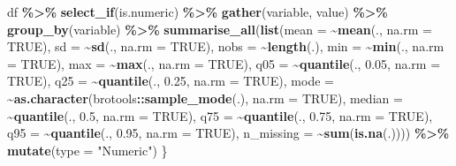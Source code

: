 \documentclass[
]{article}
\newenvironment{Shaded}{\begin{snugshade}}{\end{snugshade}}
\newcommand{\DataTypeTok}[1]{\textcolor[rgb]{0.13,0.29,0.53}{#1}}
\newcommand{\FloatTok}[1]{\textcolor[rgb]{0.00,0.00,0.81}{#1}}
\newcommand{\KeywordTok}[1]{\textcolor[rgb]{0.13,0.29,0.53}{\textbf{#1}}}
\newcommand{\NormalTok}[1]{#1}
\newcommand{\OperatorTok}[1]{\textcolor[rgb]{0.81,0.36,0.00}{\textbf{#1}}}
\newcommand{\OtherTok}[1]{\textcolor[rgb]{0.56,0.35,0.01}{#1}}
\newcommand{\StringTok}[1]{\textcolor[rgb]{0.31,0.60,0.02}{#1}}
\begin{document}
\begin{Shaded}
\begin{Highlighting}[]
\NormalTok{    df }\OperatorTok{\%\textgreater{}\%}
\StringTok{        }\KeywordTok{select\_if}\NormalTok{(is.numeric) }\OperatorTok{\%\textgreater{}\%}
\StringTok{        }\KeywordTok{gather}\NormalTok{(variable, value) }\OperatorTok{\%\textgreater{}\%}
\StringTok{        }\KeywordTok{group\_by}\NormalTok{(variable) }\OperatorTok{\%\textgreater{}\%}
\StringTok{        }\KeywordTok{summarise\_all}\NormalTok{(}\KeywordTok{list}\NormalTok{(}\DataTypeTok{mean =} \OperatorTok{\textasciitilde{}}\KeywordTok{mean}\NormalTok{(., }\DataTypeTok{na.rm =} \OtherTok{TRUE}\NormalTok{),}
                           \DataTypeTok{sd =} \OperatorTok{\textasciitilde{}}\KeywordTok{sd}\NormalTok{(., }\DataTypeTok{na.rm =} \OtherTok{TRUE}\NormalTok{),}
                           \DataTypeTok{nobs =} \OperatorTok{\textasciitilde{}}\KeywordTok{length}\NormalTok{(.),}
                           \DataTypeTok{min =} \OperatorTok{\textasciitilde{}}\KeywordTok{min}\NormalTok{(., }\DataTypeTok{na.rm =} \OtherTok{TRUE}\NormalTok{),}
                           \DataTypeTok{max =} \OperatorTok{\textasciitilde{}}\KeywordTok{max}\NormalTok{(., }\DataTypeTok{na.rm =} \OtherTok{TRUE}\NormalTok{),}
                           \DataTypeTok{q05 =} \OperatorTok{\textasciitilde{}}\KeywordTok{quantile}\NormalTok{(., }\FloatTok{0.05}\NormalTok{, }\DataTypeTok{na.rm =} \OtherTok{TRUE}\NormalTok{),}
                           \DataTypeTok{q25 =} \OperatorTok{\textasciitilde{}}\KeywordTok{quantile}\NormalTok{(., }\FloatTok{0.25}\NormalTok{, }\DataTypeTok{na.rm =} \OtherTok{TRUE}\NormalTok{),}
                           \DataTypeTok{mode =} \OperatorTok{\textasciitilde{}}\KeywordTok{as.character}\NormalTok{(brotools}\OperatorTok{::}\KeywordTok{sample\_mode}\NormalTok{(.), }\DataTypeTok{na.rm =} \OtherTok{TRUE}\NormalTok{),}
                           \DataTypeTok{median =} \OperatorTok{\textasciitilde{}}\KeywordTok{quantile}\NormalTok{(., }\FloatTok{0.5}\NormalTok{, }\DataTypeTok{na.rm =} \OtherTok{TRUE}\NormalTok{),}
                           \DataTypeTok{q75 =} \OperatorTok{\textasciitilde{}}\KeywordTok{quantile}\NormalTok{(., }\FloatTok{0.75}\NormalTok{, }\DataTypeTok{na.rm =} \OtherTok{TRUE}\NormalTok{),}
                           \DataTypeTok{q95 =} \OperatorTok{\textasciitilde{}}\KeywordTok{quantile}\NormalTok{(., }\FloatTok{0.95}\NormalTok{, }\DataTypeTok{na.rm =} \OtherTok{TRUE}\NormalTok{),}
                           \DataTypeTok{n\_missing =} \OperatorTok{\textasciitilde{}}\KeywordTok{sum}\NormalTok{(}\KeywordTok{is.na}\NormalTok{(.)))) }\OperatorTok{\%\textgreater{}\%}
\StringTok{        }\KeywordTok{mutate}\NormalTok{(}\DataTypeTok{type =} \StringTok{"Numeric"}\NormalTok{)}
\NormalTok{\}}
\end{Highlighting}
\end{Shaded}
\end{document}

